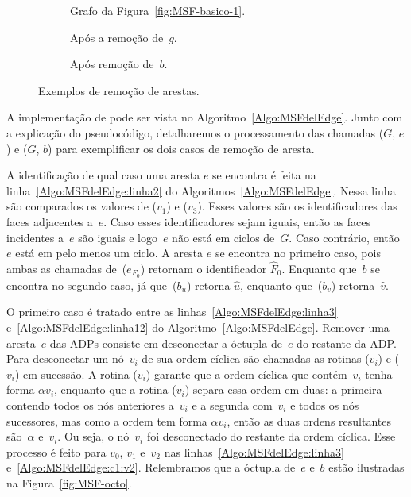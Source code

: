 \begin{figure}[htb]
\begin{subfigure}{0.3\textwidth}
\scalebox{0.7}{

}
\caption{Grafo da Figura~\ref{fig:MSF-basico-1}.}
\label{fig:MSF-basico-reprodicao}
\end{subfigure}
\begin{subfigure}{0.3\textwidth}
\scalebox{0.7}{

}
\caption{Após a remoção de~$g$.}
\label{fig:MSF-remove-ponte}
\end{subfigure}
\begin{subfigure}{0.3\textwidth}
\scalebox{0.7}{

}
\caption{Após remoção de~$b$.}
\label{fig:MSF-remove-nao-ponte}
\end{subfigure}
\caption{Exemplos de remoção de arestas.}
\label{fig:antes-depois-remocao}
\end{figure}


A implementação de \MSFdelEdge{} pode ser vista no Algoritmo~\ref{Algo:MSFdelEdge}.
Junto com a explicação do pseudocódigo, detalharemos o processamento das chamadas \MSFdelEdge($G$, $e$) e \MSFdelEdge($G$, $b$) para exemplificar os dois casos de remoção de aresta.

A identificação de qual caso uma aresta $e$ se encontra é feita na linha~\ref{Algo:MSFdelEdge:linha2} do Algoritmos~\ref{Algo:MSFdelEdge}.
Nessa linha são comparados os valores de \LCOFindNode($v_1$) e \LCOFindNode($v_3$).
Esses valores são os identificadores das faces adjacentes a~$e$.
Caso esses identificadores sejam iguais, então as faces incidentes a~$e$ são iguais e logo~$e$ não está em ciclos de~$G$.
Caso contrário, então~$e$ está em pelo menos um ciclo.
A aresta $e$ se encontra no primeiro caso, pois ambas as chamadas de~\LCOFindNode($e_{F_0}$) retornam o identificador $\hat F_0$.
Enquanto que~$b$ se encontra no segundo caso, já que~\LCOFindNode($b_u$) retorna $\hat u$, enquanto que~\LCOFindNode($b_v$) retorna~$\hat v$.

O primeiro caso é tratado entre as linhas~\ref{Algo:MSFdelEdge:linha3} e~\ref{Algo:MSFdelEdge:linha12} do Algoritmo~\ref{Algo:MSFdelEdge}.
Remover uma aresta~$e$ das ADPs consiste em desconectar a óctupla de~$e$ do restante da ADP. 
Para desconectar um nó~$v_i$ de sua ordem cíclica são chamadas as rotinas \LCOCycle($v_i$) e \LCOSplit($v_i$) em sucessão.
A rotina \LCOCycle($v_i$) garante que a ordem cíclica que contém~$v_i$ tenha forma $\alpha v_i$, enquanto que a rotina \LCOSplit($v_i$) separa essa ordem em duas: a primeira contendo todos os nós anteriores a~$v_i$ e a segunda com~$v_i$ e todos os nós sucessores, mas como a ordem tem forma $\alpha v_i$, então as duas ordens resultantes são~$\alpha$ e~$v_i$.
Ou seja, o nó~$v_i$ foi desconectado do restante da ordem cíclica.
Esse processo é feito para $v_0$, $v_1$ e~$v_2$ nas linhas~\ref{Algo:MSFdelEdge:linha3} e~\ref{Algo:MSFdelEdge:c1:v2}.
Relembramos que a óctupla de~$e$ e~$b$ estão ilustradas na Figura~\ref{fig:MSF-octo}.

